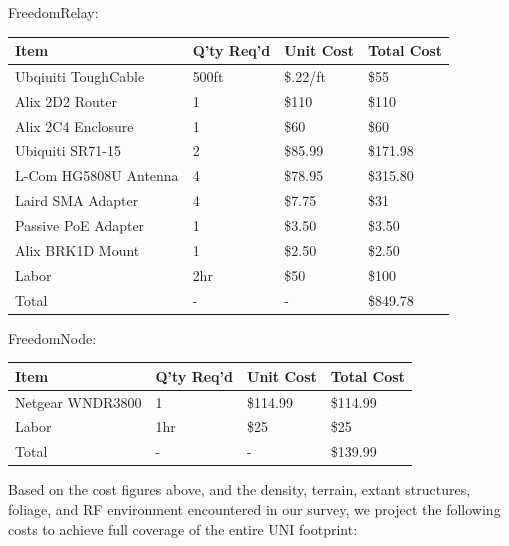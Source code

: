 FreedomRelay:
\begin{center}
\begin{tabular}{|p{5cm}|l|l|l|}
\hline
Item & Q'ty Req'd & Unit Cost & Total Cost \\ \hline
Ubqiuiti ToughCable & 500ft & \$.22/ft & \$55 \\ \hline
Alix 2D2 Router & 1 & \$110 & \$110 \\ \hline
Alix 2C4 Enclosure & 1 & \$60 & \$60 \\ \hline
Ubiquiti SR71-15 & 2 & \$85.99 & \$171.98 \\ \hline
L-Com HG5808U Antenna & 4 &  \$78.95 & \$315.80 \\ \hline 
Laird SMA Adapter & 4 & \$7.75 & \$31 \\ \hline
Passive PoE Adapter & 1 & \$3.50 & \$3.50 \\ \hline
Alix BRK1D Mount & 1 & \$2.50 & \$2.50 \\ \hline
Labor & 2hr & \$50 & \$100 \\ \hline
Total & - & - & \$849.78 \\ \hline
\end{tabular}
\end{center}

FreedomNode:
\begin{center}
\begin{tabular}{|p{5cm}|l|l|l|}
\hline
Item & Q'ty Req'd & Unit Cost & Total Cost \\ \hline
Netgear WNDR3800 & 1 & \$114.99 & \$114.99 \\ \hline
Labor & 1hr & \$25 & \$25 \\ \hline
Total & - & - & \$139.99 \\ \hline
\end{tabular}
\end{center}

Based on the cost figures above, and the density, terrain, extant structures,
foliage, and RF environment encountered in our survey, we project the following
costs to achieve full coverage of the entire UNI footprint:

